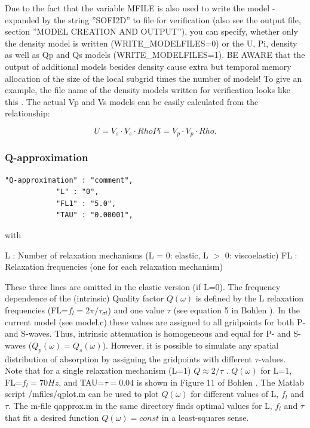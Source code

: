 \documentclass[11pt,onecolumn,oneside]{article}
\begin{document}
Due to the fact that the variable MFILE is also used to write the model - expanded by the string ''SOFI2D'' to file for verification (also see the output file, section ''MODEL CREATION AND OUTPUT''), you can specify, whether only the density model is written (WRITE\_MODELFILES=0) or the U, Pi, density as well as Qp and Qs models (WRITE\_MODELFILES=1). BE AWARE that the output of additional models besides density cause extra but temporal memory allocation of the size of the local subgrid times the number of models! To give an example, the file name of the density models written for verification looks like this . The actual Vp and Vs models can be easily calculated from the relationship:

\begin{equation}
U = V_s \cdot V_s \cdot Rho
Pi = V_p \cdot V_p \cdot Rho \mbox{.}
\label{eq_U_PI}
\end{equation}


\subsubsection{Q-approximation}
\label{Q-approximation}
\begin{verbatim}
"Q-approximation" : "comment",
			"L" : "0",
			"FL1" : "5.0", 
			"TAU" : "0.00001",
\end{verbatim}

with 

L : Number of relaxation mechanisms (L = 0: elastic, L $>$ 0: viscoelastic) \newline
FL : Relaxation frequencies (one for each relaxation mechanism) \newline

These three lines are omitted in the elastic version (if L=0). The frequency dependence of the (intrinsic) Quality factor $Q(\omega)$ is defined by the L relaxation frequencies (FL=$f_l=2\pi/\tau_{\sigma l}$) and one value $\tau$ (see equation 5 in Bohlen ). In the current model (see model.c) these values are assigned to all gridpoints for both P- and S-waves. Thus, intrinsic attenuation is homogeneous and equal for P- and S-waves ($Q_p(\omega)=Q_s(\omega)$). However, it is possible to simulate any spatial distribution of absorption by assigning the gridpoints with different
$\tau$-values. Note that for a single relaxation mechanism (L=1) 
$Q \approx 2/\tau$ \cite{bohlen:02}. $Q(\omega)$ for L=1, FL=$f_l=70Hz$, and TAU=$\tau=0.04$
is shown in Figure 11 of Bohlen .
The Matlab script /mfiles/qplot.m can be used to plot $Q(\omega)$ for different values of L, $f_l$ and $\tau$. The m-file qapprox.m in the same directory finds optimal values for L, $f_l$ and $\tau$ that fit a desired function $Q(\omega)=const$ in a least-squares sense.
\end{document}

